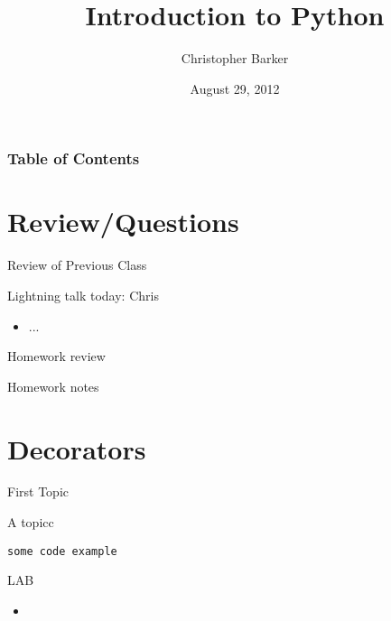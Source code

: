 \documentclass{beamer}
\title[Intro to Python: Week 9]{Introduction  to Python}
\author{Christopher Barker}
\institute{UW Continuing Education / Isilon}
\date{August 29, 2012}
\begin{document}
\begin{frame}
  \titlepage
\end{frame}

\begin{frame}
\frametitle{Table of Contents}
  \tableofcontents
\end{frame}


\section{Review/Questions}

\begin{frame}{Review of Previous Class}

Lightning talk today: Chris

\begin{itemize}
  \item ...
\end{itemize}

\end{frame}


\begin{frame}{Homework review}

  {\Large Homework notes }

\end{frame}

\section{Decorators}

\begin{frame}[fragile]{First Topic}

 {\Large A topicc}

\begin{verbatim}
some code example
\end{verbatim}

\end{frame} 

\begin{frame}{LAB}

\begin{itemize}
  \item
\end{itemize}

\end{frame}
\end{document}
